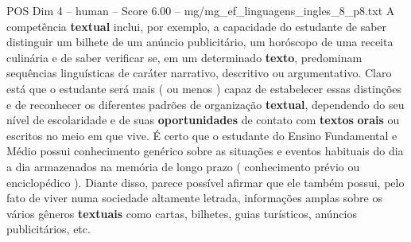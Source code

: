 \begin{textsample}{POS Dim 4 – human – Score 6.00 – mg/mg\_ef\_linguagens\_ingles\_8\_p8.txt}  \label{ex:f4_pos_001}
A competência \textbf{textual} inclui, por exemplo, a capacidade do estudante de saber distinguir um bilhete de um anúncio publicitário, um horóscopo de uma receita culinária e de saber verificar se, em um determinado \textbf{texto}, predominam sequências linguísticas de caráter narrativo, descritivo ou argumentativo.
Claro está que o estudante será mais ( ou menos ) capaz de estabelecer essas distinções e de reconhecer os diferentes padrões de organização \textbf{textual}, dependendo do seu nível de escolaridade e de suas \textbf{oportunidades} de contato com \textbf{textos} \textbf{orais} ou escritos no meio em que vive. É certo que o estudante do Ensino Fundamental e Médio possui conhecimento genérico sobre as situações e eventos habituais do dia a dia armazenados na memória de longo prazo ( conhecimento prévio ou enciclopédico ).
Diante disso, parece possível afirmar que ele também possui, pelo fato de viver numa sociedade altamente letrada, informações amplas sobre os vários gêneros \textbf{textuais} como cartas, bilhetes, guias turísticos, anúncios publicitários, etc.

\end{textsample}
